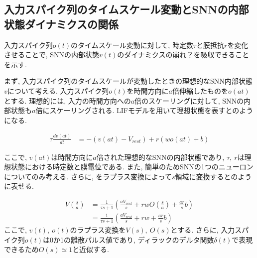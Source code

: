 \makeatletter %
\subsection{入力スパイク列のタイムスケール変動とSNNの内部状態ダイナミクスの関係}

入力スパイク列$o(t)$のタイムスケール変動に対して, 時定数$\tau$と膜抵抗$r$を変化させることで, SNNの内部状態$v(t)$のダイナミクスの崩れ？を吸収できることを示す.

まず, 入力スパイク列のタイムスケールが変動したときの理想的なSNN内部状態$v$について考える.
入力スパイク列$o(t)$を時間方向に$a$倍伸縮したものを$o(at)$とする.
理想的には, 入力の時間方向への$a$倍のスケーリングに対して, SNNの内部状態も$a$倍にスケーリングされる.
LIFモデルを用いて理想状態を表すとのようになる.

\begin{equation}
    \begin{split}
        \tau \frac{dv(at)}{dt} &= -(v(at)-V_{rest}) + r(w o(at) + b)
    \end{split}
    \label{sec2:eq:ideal}
\end{equation}

ここで, $v(at)$は時間方向に$a$倍された理想的なSNNの内部状態であり, $\tau,~r$は理想状態における時定数と膜電位である.
また, 簡単のためSNNの1つのニューロンについてのみ考える.
さらに, をラプラス変換によって$s$領域に変換するとのように表せる.

\begin{equation}
    \begin{split}
        V(\frac{s}{a}) &= \frac{1}{\tau s+1}(\frac{a V_{rest}}{s}+r w O(\frac{s}{a})+\frac{ar}{s}b)\\
        &= \frac{1}{\tau s+1}(\frac{a V_{rest}}{s}+r w +\frac{ar}{s}b)
    \end{split}
    \label{sec2:eq:ideal_laplace}
\end{equation}
ここで, $v(t),~o(t)$のラプラス変換を$V(s), ~ O(s)$とする.
さらに, 入力スパイク列$o(t)$は0か1の離散パルス値であり, ディラックのデルタ関数$\delta(t)$で表現できる\cite{Henkes2024}ため$O(s)\simeq1$と近似する.

